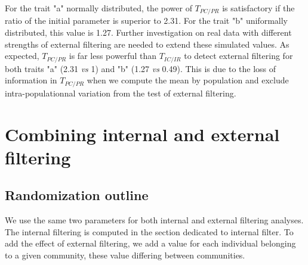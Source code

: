 \documentclass[12pt]{article}\usepackage[]{graphicx}\usepackage[]{color}
\begin{document}
For the trait "a" normally distributed, the power of $T_{PC/PR}$ is satisfactory if the ratio of the initial parameter is superior to
 2.31. For the trait "b" uniformally distributed, this value is 1.27. 
 Further investigation on real data with different strengths of external filtering are needed to extend these simulated values. As expected, $T_{PC/PR}$ is far less powerful than $T_{IC/IR}$ to detect external filtering for both traits "a" (2.31 \textit{vs} 1) and "b" (1.27 \textit{vs} 0.49). This is due to the loss of information in $T_{PC/PR}$ when we compute the mean by population and exclude intra-populationnal variation from the test of external filtering. 




































\cleardoublepage

\section{Combining internal and external filtering}
\label{sect:IntExtFilt}

  \subsection{Randomization outline}
We use the same two parameters for both internal and external filtering analyses. The internal filtering is computed in the section dedicated to internal filter. To add the effect of external filtering, we add a value for each individual belonging to a given community, these value differing between communities.
\end{document}
